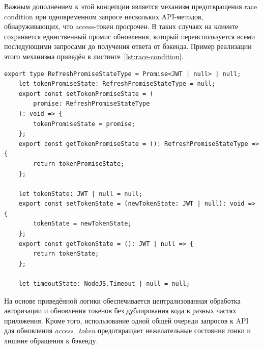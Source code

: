 Важным дополнением к этой концепции является механизм предотвращения race condition при одновременном запросе нескольких API-методов, обнаруживающих, что access-токен просрочен. В таких случаях на клиенте сохраняется единственный промис обновления, который переиспользуется всеми последующими запросами до получения ответа от бэкенда. Пример реализации этого механизма приведён в листинге~\ref{lst:race-condition}.

\begin{lstlisting}[caption={Механизм предотвращения race condition при рефреше токена}, label={lst:race-condition}]
	export type RefreshPromiseStateType = Promise<JWT | null> | null;
	let tokenPromiseState: RefreshPromiseStateType = null;
	export const setTokenPromiseState = (
		promise: RefreshPromiseStateType
	): void => {
		tokenPromiseState = promise;
	};
	export const getTokenPromiseState = (): RefreshPromiseStateType => {
		return tokenPromiseState;
	};

	let tokenState: JWT | null = null;
	export const setTokenState = (newTokenState: JWT | null): void => {
		tokenState = newTokenState;
	};
	export const getTokenState = (): JWT | null => {
		return tokenState;
	};

	let timeoutState: NodeJS.Timeout | null = null;
\end{lstlisting}

На основе приведённой логики обеспечивается централизованная обработка авторизации и обновления токенов без дублирования кода в разных частях приложения. Кроме того, использование одной общей очереди запросов к API для обновления \textit{access\_token} предотвращает нежелательные состояния гонки и лишние обращения к бэкенду.
